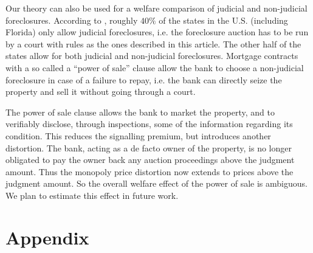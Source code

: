 \documentclass[11pt,twopage]{article}
\begin{document}
Our theory can also be used for a welfare comparison of judicial and non-judicial foreclosures. 
According to \cite{nelson2004reforming}, roughly $40\%$ of the states in the
U.S. (including Florida) only allow judicial foreclosures, i.e. the
foreclosure auction has to be run by a court with rules as the ones
described in this article. The other half of the states allow for both
judicial and non-judicial foreclosures.  Mortgage contracts
with a so called a ``power of sale'' clause allow the bank to choose a non-judicial
foreclosure in case of a failure to repay, i.e. the bank can directly
seize the property and sell it without going through a court.  

The power of sale clause allows the bank to market the property, and to verifiably disclose, through inspections, some of the information regarding its condition. This reduces the signalling premium, but introduces another distortion. The bank, acting as a de facto owner of the property, is no longer obligated to pay the owner back any auction proceedings above the judgment amount. Thus the monopoly price distortion now extends to prices above the judgment amount. So the overall welfare effect of the power of sale is ambiguous. We plan to estimate this effect in future work.


%
%
%

\appendix
\section*{Appendix}
\end{document}
